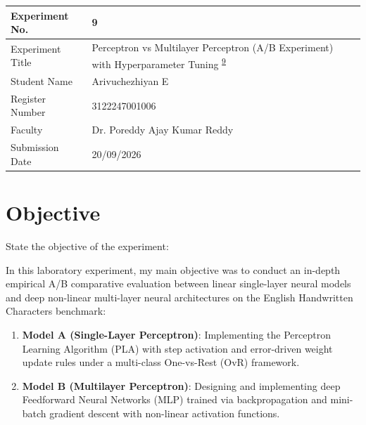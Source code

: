 \documentclass[12pt,a4paper]{article}
\begin{document}

\begin{tabular}{|p{4cm}|p{11cm}|}
\hline
Experiment No. & 9 \\ \hline
Experiment Title & Perceptron vs Multilayer Perceptron (A/B Experiment) with Hyperparameter Tuning \textsuperscript{\href{https://github.com/arivuchezhiyan/Machine_Learning/tree/main/experiment_9}{9}} \\ \hline
Student Name & Arivuchezhiyan E \\ \hline
Register Number & 3122247001006 \\ \hline
Faculty & Dr. Poreddy Ajay Kumar Reddy \\ \hline
Submission Date & 20/09/2026 \\ \hline
\end{tabular}

\vspace{0.5cm}

\section{Objective}
State the objective of the experiment:

In this laboratory experiment, my main objective was to conduct an in-depth empirical A/B comparative evaluation between linear single-layer neural models and deep non-linear multi-layer neural architectures on the English Handwritten Characters benchmark:
\begin{enumerate}
\item \textbf{Model A (Single-Layer Perceptron)}: Implementing the Perceptron Learning Algorithm (PLA) with step activation and error-driven weight update rules under a multi-class One-vs-Rest (OvR) framework.
\item \textbf{Model B (Multilayer Perceptron)}: Designing and implementing deep Feedforward Neural Networks (MLP) trained via backpropagation and mini-batch gradient descent with non-linear activation functions.
\end{enumerate}
\end{document}
